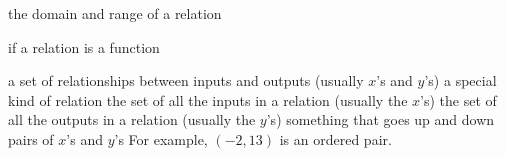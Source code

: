 \documentclass[fleqn,letterpaper,12pt,printwatermark=false]{memoir}
\begin{document}
\newcommand{\myClassName}{Pre-AP Algebra 2}
\newcommand{\myUnitNumber}{1}
\newcommand{\myUnitTitle}{Introduction to Functions}
\newcommand{\myLessonNumber}{1}
\newcommand{\myLessonTitle}{Relations and Functions}



\pagestyle{myPagestyle}

\checkandfixthelayout
{}

\begin{myNotesHeader}
    \item {} the domain and range of a relation
    \item {} if a relation is a function
\end{myNotesHeader}

\begin{myVocabulary}
        {
            a set of relationships between inputs and outputs
            (usually $x$'s and $y$'s)
        }
        {
            a special kind of relation
        }
        {
            the set of all the inputs in a relation 
            (usually the $x$'s)
        }
        {
            the set of all the outputs in a relation 
            (usually the $y$'s)
        }
        {
            something that goes up and down
        }
        {
            pairs of $x$'s and $y$'s For example, $(-2,13)$ is an ordered pair.
        }
\end{myVocabulary}
\end{document}
